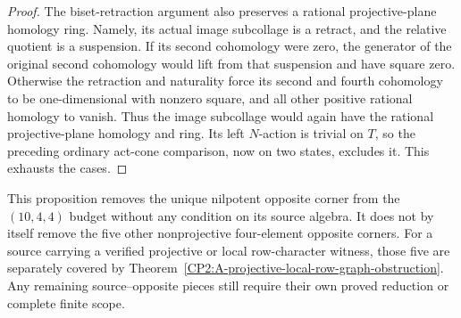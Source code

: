 \begin{proof}
The biset-retraction argument also preserves a rational
projective-plane homology ring.  Namely, its actual image subcollage
is a retract, and the relative quotient is a suspension.  If its
second cohomology were zero, the generator of the original second
cohomology would lift from that suspension and have square zero.
Otherwise the retraction and naturality force its second and fourth
cohomology to be one-dimensional with nonzero square, and all other
positive rational homology to vanish.  Thus the image subcollage
would again have the rational projective-plane homology and ring.
Its left $N$-action is trivial on $T$, so the preceding ordinary
act-cone comparison, now on two states, excludes it.  This exhausts
the cases.
\end{proof}

\begin{remark*}
This proposition removes the unique nilpotent opposite corner from
the $(10,4,4)$ budget without any condition on its source algebra.
It does not by itself remove the five other nonprojective
four-element opposite corners.  For a source carrying a verified
projective or local row-character witness, those five are separately
covered by Theorem~\ref{CP2:A-projective-local-row-graph-obstruction}.
Any remaining source--opposite pieces still require their own proved
reduction or complete finite scope.
\end{remark*}
